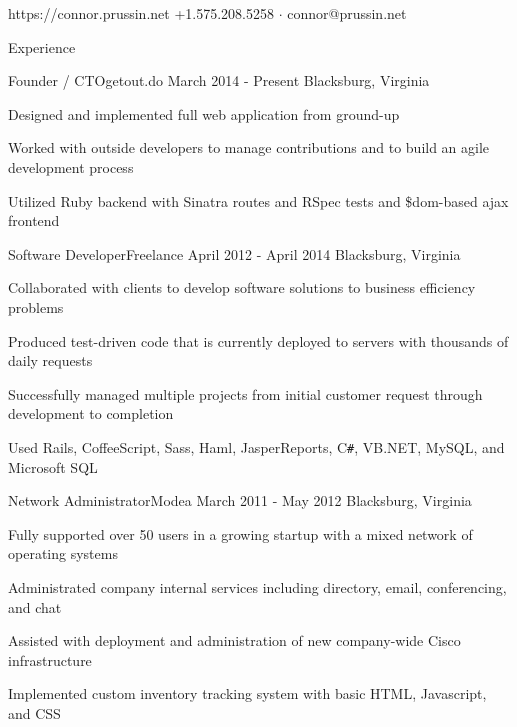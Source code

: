 \documentclass{resume}
\begin{document}
	           {https://connor.prussin.net}
	           {+1.575.208.5258 $\cdot$ connor@prussin.net}

	\begin{section}{Experience}
		\begin{experience}{Founder / CTO}{getout.do}
		                  {March 2014 - Present}
		                  {Blacksburg, Virginia}
			\item Designed and implemented full web application from ground-up
			\item Worked with outside developers to manage contributions and to build
			      an agile development process
			\item Utilized Ruby backend with Sinatra routes and RSpec tests and
			      \$dom-based ajax frontend
		\end{experience}

		\begin{experience}{Software Developer}{Freelance}
		                  {April 2012 - April 2014}
		                  {Blacksburg, Virginia}
			\item Collaborated with clients to develop software solutions to business
			      efficiency problems
			\item Produced test-driven code that is currently deployed to servers
			      with thousands of daily requests
			\item Successfully managed multiple projects from initial customer
			      request through development to completion
			\item Used Rails, CoffeeScript, Sass, Haml, JasperReports, C\texttt{\#},
			      VB.NET, MySQL, and Microsoft SQL
		\end{experience}

		\begin{experience}{Network Administrator}{Modea}
		                  {March 2011 - May 2012}
		                  {Blacksburg, Virginia}
			\item Fully supported over 50 users in a growing startup with a mixed
			      network of operating systems
			\item Administrated company internal services including directory, email,
			      conferencing, and chat
			\item Assisted with deployment and administration of new company-wide
			      Cisco infrastructure
			\item Implemented custom inventory tracking system with basic HTML,
			      Javascript, and CSS
		\end{experience}


\end{section}
\end{document}
